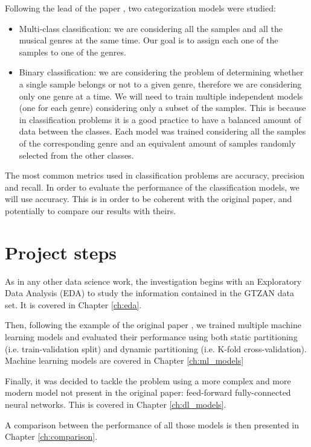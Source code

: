 \documentclass{Configuration_Files/PoliMi3i_thesis}
\begin{document}
Following the lead of the paper \cite{original-paper}, two categorization models were studied:
\begin{itemize}
    \item Multi-class classification: we are considering all the samples and all the musical genres at the same time. Our goal is to assign each one of the samples to one of the genres.
    \item Binary classification: we are considering the problem of determining whether a single sample belongs or not to a given genre, therefore we are considering only one genre at a time. We will need to train multiple independent models (one for each genre) considering only a subset of the samples. This is because in classification problems it is a good practice to have a balanced amount of data between the classes. Each model was trained considering all the samples of the corresponding genre and an equivalent amount of samples randomly selected from the other classes.
\end{itemize}

The most common metrics used in classification problems are accuracy, precision and recall. In order to evaluate the performance of the classification models, we will use accuracy. This is in order to be coherent with the original paper, and potentially to compare our results with theirs. 


\section*{Project steps}
\label{sec:steps}
As in any other data science work, the investigation begins with an Exploratory Data Analysis (EDA) to study the information contained in the GTZAN data set. It is covered in Chapter \ref{ch:eda}.

Then, following the example of the original paper \cite{original-paper}, we trained multiple machine learning models and evaluated their performance using both static partitioning (i.e. train-validation split) and dynamic partitioning (i.e. K-fold cross-validation).
Machine learning models are covered in Chapter \ref{ch:ml_models}

Finally, it was decided to tackle the problem using a more complex and more modern model not present in the original paper: feed-forward fully-connected neural networks. This is covered in Chapter \ref{ch:dl_models}.

A comparison between the performance of all those models is then presented in Chapter \ref{ch:comparison}.
\end{document}
